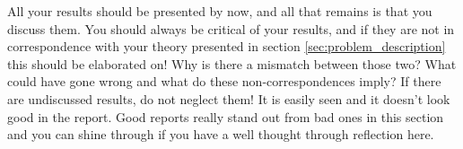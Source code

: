 All your results should be presented by now, and all that remains is that you discuss them. You should always be critical of your results, and if they are not in correspondence with your theory presented in section \ref{sec:problem_description} this should be elaborated on! Why is there a mismatch between those two? What could have gone wrong and what do these non-correspondences imply? If there are undiscussed results, do not neglect them! It is easily seen and it doesn't look good in the report. Good reports really stand out from bad ones in this section and you can shine through if you have a well thought through reflection here.